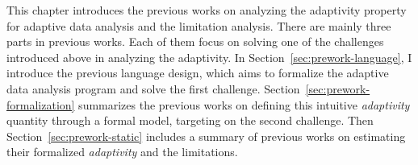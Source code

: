 This chapter introduces the previous works on analyzing the adaptivity property
for adaptive data analysis and the limitation analysis.
There are mainly three parts in previous works.
Each of them focus on solving one of the challenges introduced above in analyzing the adaptivity.
In Section~\ref{sec:prework-language}, I introduce the previous language design, which aims to formalize
the adaptive data analysis program and solve the first challenge.
Section~\ref{sec:prework-formalization} summarizes the previous works
on defining this intuitive \emph{adaptivity} quantity through a formal model,
targeting on the second challenge.
Then Section~\ref{sec:prework-static} includes a summary of previous works on estimating
their formalized \emph{adaptivity} and the limitations.
